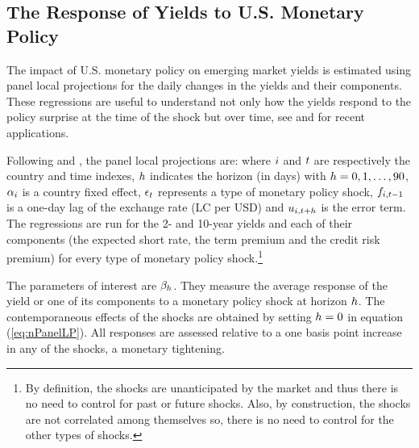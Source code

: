 {\subsection{The Response of Yields to U.S. Monetary Policy} \label{sec:LPs}
\iftoggle{toclinks}{\gototoc}{} %

The impact of U.S. monetary policy on emerging market yields is estimated using panel local projections for the daily changes in the yields and their components.
These regressions are useful to understand not only how the yields respond to the policy surprise at the time of the shock but over time, see \cite{HofmannShimShin:2019} and \cite{ACDM:2019} for recent applications.

Following \cite{Jorda:2005} and \cite{ACDM:2019}, the panel local projections are:
\noindent where \(i\) and \(t\) are respectively the country and time indexes, \(h\) indicates the horizon (in days) with \(h = 0, 1, \ldots, 90\),  \(\alpha_{i}\) is a country fixed effect, \(\epsilon_{t}\) represents a type of monetary policy shock, \(f_{i,{t-1}}\) is a one-day lag of the exchange rate (LC per USD) and \(u_{i,{t+h}}\) is the error term.
The regressions are run for the 2- and 10-year yields and each of their components (the expected short rate, the term premium and the credit risk premium) for every type of monetary policy shock.\footnote{ By definition, the shocks are unanticipated by the market and thus there is no need to control for past or future shocks. Also, by construction, the shocks are not correlated among themselves so, there is no need to control for the other types of shocks.}

The parameters of interest are \(\beta_{h}\). 
They measure the average response of the yield or one of its components to a monetary policy shock at horizon \(h\).
The contemporaneous effects of the shocks are obtained by setting \(h = 0\) in equation (\ref{eq:nPanelLP}).
All responses are assessed relative to a one basis point increase in any of the shocks, a monetary tightening.


}
